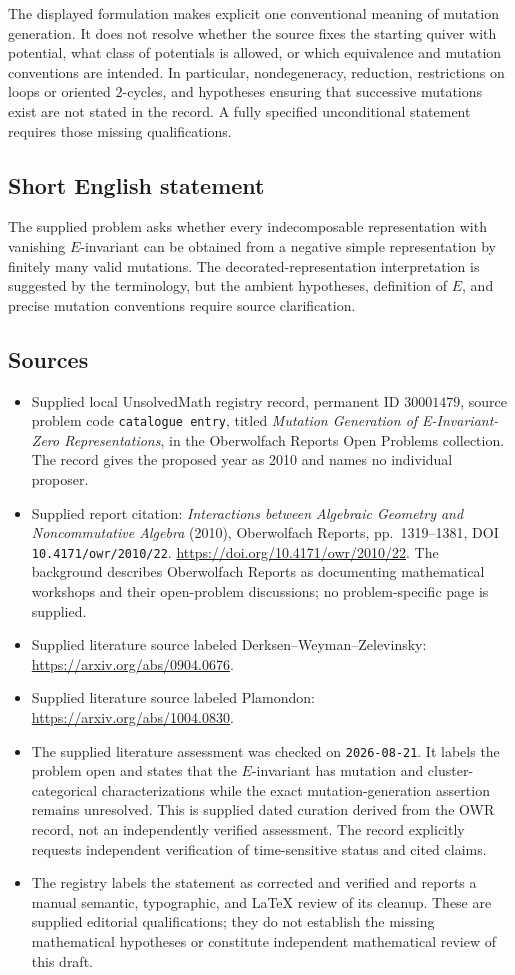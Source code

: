 \documentclass[11pt]{article}
\begin{document}
The displayed formulation makes explicit one conventional meaning of mutation generation. It does not resolve whether the source fixes the starting quiver with potential, what class of potentials is allowed, or which equivalence and mutation conventions are intended. In particular, nondegeneracy, reduction, restrictions on loops or oriented \(2\)-cycles, and hypotheses ensuring that successive mutations exist are not stated in the record. A fully specified unconditional statement requires those missing qualifications.
\subsection{Short English statement}
The supplied problem asks whether every indecomposable representation with vanishing \(E\)-invariant can be obtained from a negative simple representation by finitely many valid mutations. The decorated-representation interpretation is suggested by the terminology, but the ambient hypotheses, definition of \(E\), and precise mutation conventions require source clarification.
\subsection{Sources}
\begin{itemize}
\item Supplied local UnsolvedMath registry record, permanent ID \(30001479\), source problem code \texttt{catalogue entry}, titled \emph{Mutation Generation of E-Invariant-Zero Representations}, in the Oberwolfach Reports Open Problems collection. The record gives the proposed year as 2010 and names no individual proposer.
\item Supplied report citation: \emph{Interactions between Algebraic Geometry and Noncommutative Algebra} (2010), Oberwolfach Reports, pp.\ 1319--1381, DOI \texttt{10.4171/owr/2010/22}. \url{https://doi.org/10.4171/owr/2010/22}. The background describes Oberwolfach Reports as documenting mathematical workshops and their open-problem discussions; no problem-specific page is supplied.
\item Supplied literature source labeled Derksen--Weyman--Zelevinsky: \url{https://arxiv.org/abs/0904.0676}.
\item Supplied literature source labeled Plamondon: \url{https://arxiv.org/abs/1004.0830}.
\item The supplied literature assessment was checked on \texttt{2026-08-21}. It labels the problem open and states that the \(E\)-invariant has mutation and cluster-categorical characterizations while the exact mutation-generation assertion remains unresolved. This is supplied dated curation derived from the OWR record, not an independently verified assessment. The record explicitly requests independent verification of time-sensitive status and cited claims.
\item The registry labels the statement as corrected and verified and reports a manual semantic, typographic, and LaTeX review of its cleanup. These are supplied editorial qualifications; they do not establish the missing mathematical hypotheses or constitute independent mathematical review of this draft.
\end{itemize}
\end{document}
